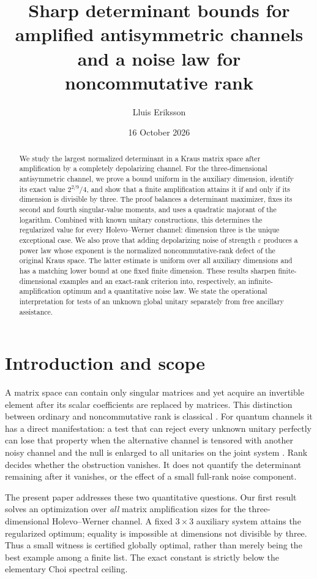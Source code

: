 \documentclass[11pt,a4paper]{article}
\title{Sharp determinant bounds for amplified antisymmetric channels\\
and a noise law for noncommutative rank}
\author{Lluis Eriksson}
\date{16 October 2026}
\theoremstyle{remark}\newtheorem{remark}[theorem]{Remark}
\begin{document}
\maketitle
\begin{abstract}
We study the largest normalized determinant in a Kraus matrix space after amplification by a completely depolarizing channel. For the three-dimensional antisymmetric channel, we prove a bound uniform in the auxiliary dimension, identify its exact value \(2^{2/9}/4\), and show that a finite amplification attains it if and only if its dimension is divisible by three. The proof balances a determinant maximizer, fixes its second and fourth singular-value moments, and uses a quadratic majorant of the logarithm. Combined with known unitary constructions, this determines the regularized value for every Holevo--Werner channel: dimension three is the unique exceptional case. We also prove that adding depolarizing noise of strength \(\varepsilon\) produces a power law whose exponent is the normalized noncommutative-rank defect of the original Kraus space. The latter estimate is uniform over all auxiliary dimensions and has a matching lower bound at one fixed finite dimension. These results sharpen finite-dimensional examples and an exact-rank criterion into, respectively, an infinite-amplification optimum and a quantitative noise law. We state the operational interpretation for tests of an unknown global unitary separately from free ancillary assistance.
\end{abstract}

\section{Introduction and scope}
A matrix space can contain only singular matrices and yet acquire an invertible element after its scalar coefficients are replaced by matrices. This distinction between ordinary and noncommutative rank is classical \cite{DM,IQS,Li}. For quantum channels it has a direct manifestation: a test that can reject every unknown unitary perfectly can lose that property when the alternative channel is tensored with another noisy channel and the null is enlarged to all unitaries on the joint system \cite{previous}. Rank decides whether the obstruction vanishes. It does not quantify the determinant remaining after it vanishes, or the effect of a small full-rank noise component.

The present paper addresses these two quantitative questions. Our first result solves an optimization over \emph{all} matrix amplification sizes for the three-dimensional Holevo--Werner channel. A fixed \(3\times3\) auxiliary system attains the regularized optimum; equality is impossible at dimensions not divisible by three. Thus a small witness is certified globally optimal, rather than merely being the best example among a finite list. The exact constant is strictly below the elementary Choi spectral ceiling.
\end{document}
